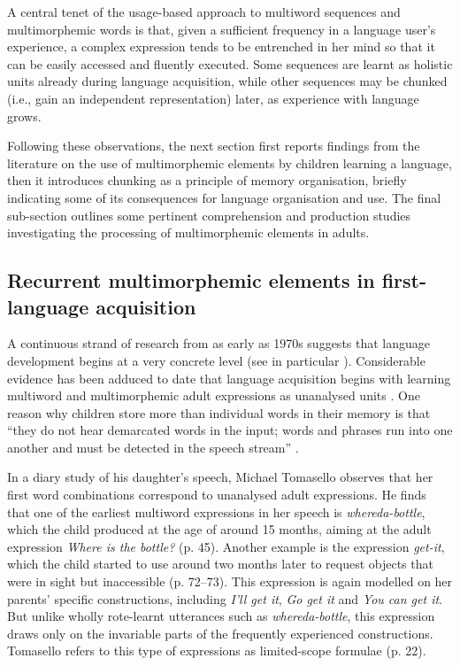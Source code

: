 A central tenet of the usage-based approach to multiword sequences and multimorphemic words is that, given a sufficient frequency in a language user's experience, a complex expression tends to be entrenched in her mind so that it can be easily accessed and fluently executed. Some sequences are learnt as holistic units already during  language acquisition, while other sequences may be chunked (i.e., gain an independent representation) later, as experience with language grows. 

Following these observations, the next section first reports findings from the literature on the use of multimorphemic elements by children learning a language, then it introduces chunking as a principle of memory organisation, briefly indicating some of its consequences for language organisation and use. The final sub-section outlines some pertinent comprehension and production studies investigating the processing of multimorphemic elements in adults. 

\subsection{Recurrent multimorphemic elements in first-language acquisition}
A continuous strand of research from as early as 1970s suggests that language development begins at a very concrete level (see in particular \citealt{bowerman-1973,clark-1974,braine-1976,tomasello-1992,pine-lieven-1993,dabrowska-lieven-2005}). Considerable evidence has been adduced to date that language acquisition begins with learning multiword and multimorphemic adult expressions as unanalysed units \citep{lieven-pine-baldwin-1997,dabrowska-2004,bannard-matthews-2008,lieven-salomo-tomasello-2009,arnon-clark-2011}. One reason why children store more than individual words in their memory is that ``they do not hear demarcated words in the input; words and phrases run into one another and must be detected in the speech stream'' \citep{bannard-matthews-2008}.

In a diary study of his daughter's speech, Michael Tomasello \citeyear{tomasello-1992} observes that her first word combinations correspond to unanalysed adult expressions. He finds that one of the earliest multiword expressions in her speech is \textit{whereda-bottle}, which the child produced at the age of around 15 months, aiming at the adult expression \textit{Where is the bottle?} (p. 45). Another example is the expression \textit{get-it}, which the child started to use around two months later to request objects that were in sight but inaccessible (p. 72--73). This expression is again modelled on her parents' specific constructions, including \textit{I'll get it}, \textit{Go get it} and \textit{You can get it}. But unlike wholly rote-learnt utterances such as \textit{whereda-bottle}, this expression draws only on the invariable parts of the frequently experienced constructions. Tomasello refers to this type of expressions as limited-scope formulae (p. 22).

